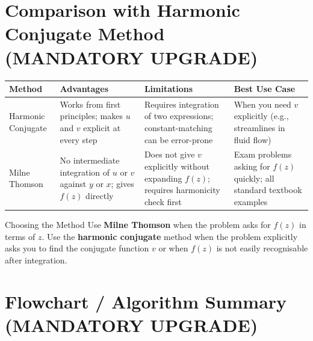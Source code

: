 \documentclass[12pt,a4paper]{article}
\begin{document}
\section{Comparison with Harmonic Conjugate Method (MANDATORY UPGRADE)}

\begin{center}
\begin{tabular}{@{}p{3cm}p{4.5cm}p{4.5cm}p{3.5cm}@{}}
\toprule
\textbf{Method} & \textbf{Advantages} & \textbf{Limitations} & \textbf{Best Use Case} \\
\midrule
Harmonic Conjugate & Works from first principles; makes \( u \) and \( v \) explicit at every step & Requires integration of two expressions; constant-matching can be error-prone & When you need \( v \) explicitly (e.g., streamlines in fluid flow) \\
\midrule
Milne Thomson & No intermediate integration of \( u \) or \( v \) against \( y \) or \( x \); gives \( f(z) \) directly & Does not give \( v \) explicitly without expanding \( f(z) \); requires harmonicity check first & Exam problems asking for \( f(z) \) quickly; all standard textbook examples \\
\bottomrule
\end{tabular}
\end{center}

\begin{learnbox}{Choosing the Method}
Use \textbf{Milne Thomson} when the problem asks for \( f(z) \) in terms of \( z \). Use the \textbf{harmonic conjugate} method when the problem explicitly asks you to find the conjugate function \( v \) or when \( f(z) \) is not easily recognisable after integration.
\end{learnbox}

\section{Flowchart / Algorithm Summary (MANDATORY UPGRADE)}
\end{document}
